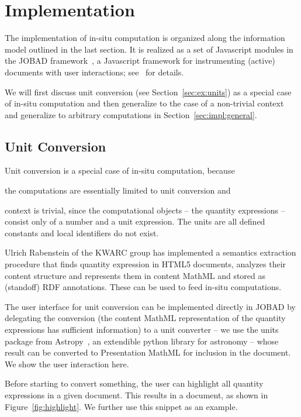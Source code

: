 \section{Implementation}\label{sec:impl}
The implementation of in-situ computation is organized along the information model outlined in
the last section.
It is realized as a set of Javascript modules in the JOBAD framework~\cite{JOBAD:on}, a Javascript framework for instrumenting (active) documents with user interactions; see~\cite{GLR:WebSvcActMathDoc09} for details.

We will first discuss unit conversion (see Section~\ref{sec:ex:units}) as a special case of in-situ computation and then generalize to the case of a non-trivial context and generalize to arbitrary computations in Section~\ref{sec:impl:general}.

\subsection{Unit Conversion}\label{sec:impl:units}
Unit conversion is a special case of in-situ computation, because
\begin{compactitem}
\item the computations are essentially limited to unit conversion and
\item context is trivial, since the computational objects -- the quantity expressions -- consist only of a number and a unit expression. The units are all defined constants and local identifiers do not exist.
\end{compactitem}
Ulrich Rabenstein of the KWARC group has implemented a semantics extraction procedure that finds quantity expression in HTML5 documents, analyzes their content structure and represents them in content MathML and stored as (standoff) RDF annotations.
These can be used to feed in-situ computations.

The user interface for unit conversion can be implemented directly in JOBAD by delegating the conversion (the content MathML representation of the quantity expressions has sufficient information) to a unit converter -- we use the units package from Astropy~\cite{astropy}, an extendible python library for astronomy -- whose result can be converted to Presentation MathML for inclusion in the document.
We show the user interaction here.

Before starting to convert something, the user can highlight all quantity expressions in a given document.
This results in a document, as shown in Figure~\ref{fig:highlight}.
We further use this snippet as an example.

